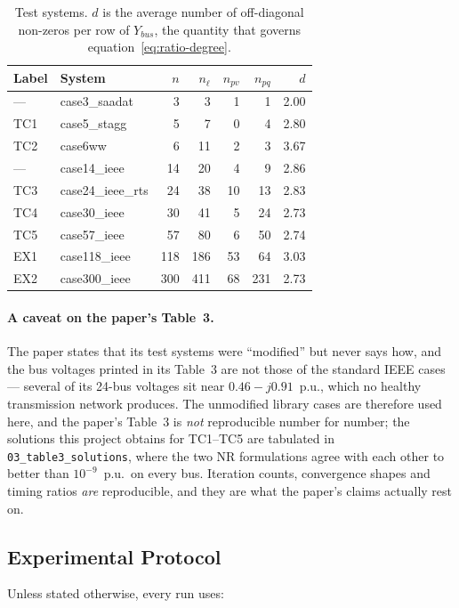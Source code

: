 \documentclass[sigconf,nonacm]{acmart}
\begin{document}
\begin{table}[t]
\centering
\caption{Test systems. $d$ is the average number of off-diagonal non-zeros per
row of $Y_{bus}$, the quantity that governs
equation~\eqref{eq:ratio-degree}.}
\label{tab:cases}
\small
\begin{tabular}{l l r r r r r}
\toprule
Label & System & $n$ & $n_\ell$ & $n_{pv}$ & $n_{pq}$ & $d$ \\
\midrule
---  & case3\_saadat     & 3   & 3   & 1  & 1   & 2.00 \\
TC1  & case5\_stagg      & 5   & 7   & 0  & 4   & 2.80 \\
TC2  & case6ww           & 6   & 11  & 2  & 3   & 3.67 \\
---  & case14\_ieee      & 14  & 20  & 4  & 9   & 2.86 \\
TC3  & case24\_ieee\_rts & 24  & 38  & 10 & 13  & 2.83 \\
TC4  & case30\_ieee      & 30  & 41  & 5  & 24  & 2.73 \\
TC5  & case57\_ieee      & 57  & 80  & 6  & 50  & 2.74 \\
EX1  & case118\_ieee     & 118 & 186 & 53 & 64  & 3.03 \\
EX2  & case300\_ieee     & 300 & 411 & 68 & 231 & 2.73 \\
\bottomrule
\end{tabular}
\end{table}

\paragraph{A caveat on the paper's Table~3.}
The paper states that its test systems were ``modified'' but never says how, and
the bus voltages printed in its Table~3 are not those of the standard IEEE
cases --- several of its 24-bus voltages sit near $0.46-j0.91$~p.u., which no
healthy transmission network produces. The unmodified library cases are
therefore used here, and the paper's Table~3 is \emph{not} reproducible number
for number; the solutions this project obtains for TC1--TC5 are tabulated in
\texttt{03\_table3\_solutions}, where the two NR formulations agree with each
other to better than $10^{-9}$~p.u.\ on every bus. Iteration counts, convergence
shapes and timing ratios \emph{are} reproducible, and they are what the paper's
claims actually rest on.

\subsection{Experimental Protocol}
\label{sec:protocol}
Unless stated otherwise, every run uses:
\end{document}
